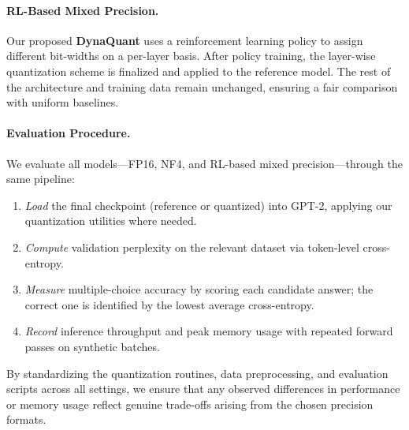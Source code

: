 \documentclass{article}
\begin{document}
	\paragraph{RL-Based Mixed Precision.}
	Our proposed \textbf{DynaQuant} uses a reinforcement learning policy to assign different bit-widths on a per-layer basis. After policy training, the layer-wise quantization scheme is finalized and applied to the reference model. The rest of the architecture and training data remain unchanged, ensuring a fair comparison with uniform baselines.
	
	\paragraph{Evaluation Procedure.}
	We evaluate all models---FP16, NF4, and RL-based mixed precision---through the same pipeline:
	\begin{enumerate}
		\item \emph{Load} the final checkpoint (reference or quantized) into GPT-2, applying our quantization utilities where needed.
		\item \emph{Compute} validation perplexity on the relevant dataset via token-level cross-entropy.
		\item \emph{Measure} multiple-choice accuracy by scoring each candidate answer; the correct one is identified by the lowest average cross-entropy.
		\item \emph{Record} inference throughput and peak memory usage with repeated forward passes on synthetic batches.
	\end{enumerate}
	
	By standardizing the quantization routines, data preprocessing, and evaluation scripts across all settings, we ensure that any observed differences in performance or memory usage reflect genuine trade-offs arising from the chosen precision formats.
	
\end{document}
